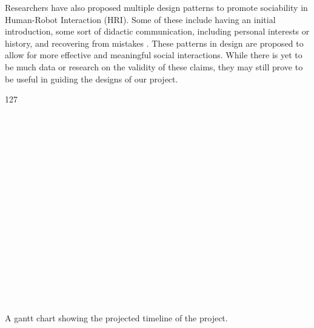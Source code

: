 \documentclass[onecolumn, draftclsnofoot,10pt, compsoc]{IEEEtran}
\begin{document}
Researchers have also proposed multiple design patterns to promote sociability in Human-Robot Interaction (HRI). Some of these include having an initial introduction, some sort of didactic communication, including personal interests or history, and recovering from mistakes \cite{Kahn:2008}. These patterns in design are proposed to allow for more effective and meaningful social interactions. While there is yet to be much data or research on the validity of these claims, they may still prove to be useful in guiding the designs of our project.
\pagebreak
\begin{landscape}

\begin{table}
	\begin{ganttchart}[
		hgrid,
		vgrid=true]{1}{27}

		 \\
		 \\
		 \\
		 \\
		 \\
		 \\
		 \\
		 \\
		 \\
		 \\
		 \\
		 \\
		 \\
		 \\
		 \\
		 \\




	\end{ganttchart}
	\caption{A gantt chart showing the projected timeline of the project.}
	\label{Gantt Chart}

\end{table}

\end{landscape}
\pagebreak




\end{document}

